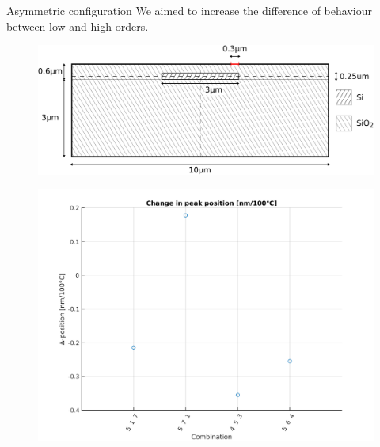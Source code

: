 \documentclass[11pt, leqno]{beamer}
\begin{document}
\begin{frame}{Asymmetric configuration}
	We aimed to increase the difference of behaviour between low and high orders.
	\begin{figure}
		\centering
		\includegraphics[width=\textwidth]{geometryAR.pdf}
	\end{figure}
\end{frame}
\begin{frame}
	\begin{figure}
		\centering
		\includegraphics[height=.85\textheight]{asym_ppc2.png}
	\end{figure}
\end{frame}
\end{document}
